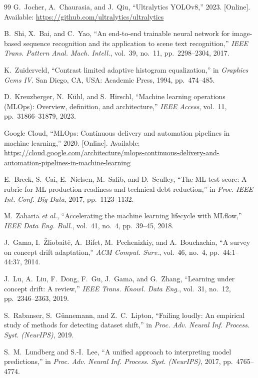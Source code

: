 \documentclass[conference]{IEEEtran}
\begin{document}
\begin{thebibliography}{99}
G.~Jocher, A.~Chaurasia, and J.~Qiu, ``Ultralytics YOLOv8,'' 2023. [Online].
Available: \url{https://github.com/ultralytics/ultralytics}

B.~Shi, X.~Bai, and C.~Yao, ``An end-to-end trainable neural network for
image-based sequence recognition and its application to scene text
recognition,'' \emph{IEEE Trans. Pattern Anal. Mach. Intell.}, vol.~39, no.~11,
pp.~2298--2304, 2017.

K.~Zuiderveld, ``Contrast limited adaptive histogram equalization,'' in
\emph{Graphics Gems IV}. San Diego, CA, USA: Academic Press, 1994, pp.~474--485.

D.~Kreuzberger, N.~K{\"u}hl, and S.~Hirschl, ``Machine learning operations
(MLOps): Overview, definition, and architecture,'' \emph{IEEE Access}, vol.~11,
pp.~31866--31879, 2023.

Google Cloud, ``MLOps: Continuous delivery and automation pipelines in machine
learning,'' 2020. [Online]. Available:
\url{https://cloud.google.com/architecture/mlops-continuous-delivery-and-automation-pipelines-in-machine-learning}

E.~Breck, S.~Cai, E.~Nielsen, M.~Salib, and D.~Sculley, ``The ML test score: A
rubric for ML production readiness and technical debt reduction,'' in
\emph{Proc. IEEE Int. Conf. Big Data}, 2017, pp.~1123--1132.

M.~Zaharia \emph{et al.}, ``Accelerating the machine learning lifecycle with
MLflow,'' \emph{IEEE Data Eng. Bull.}, vol.~41, no.~4, pp.~39--45, 2018.

J.~Gama, I.~{\v{Z}}liobait{\.e}, A.~Bifet, M.~Pechenizkiy, and A.~Bouchachia, ``A
survey on concept drift adaptation,'' \emph{ACM Comput. Surv.}, vol.~46, no.~4,
pp.~44:1--44:37, 2014.

J.~Lu, A.~Liu, F.~Dong, F.~Gu, J.~Gama, and G.~Zhang, ``Learning under concept
drift: A review,'' \emph{IEEE Trans. Knowl. Data Eng.}, vol.~31, no.~12,
pp.~2346--2363, 2019.

S.~Rabanser, S.~G{\"u}nnemann, and Z.~C.~Lipton, ``Failing loudly: An empirical
study of methods for detecting dataset shift,'' in \emph{Proc. Adv. Neural Inf.
Process. Syst. (NeurIPS)}, 2019.

S.~M.~Lundberg and S.-I.~Lee, ``A unified approach to interpreting model
predictions,'' in \emph{Proc. Adv. Neural Inf. Process. Syst. (NeurIPS)}, 2017,
pp.~4765--4774.


\end{thebibliography}
\end{document}
